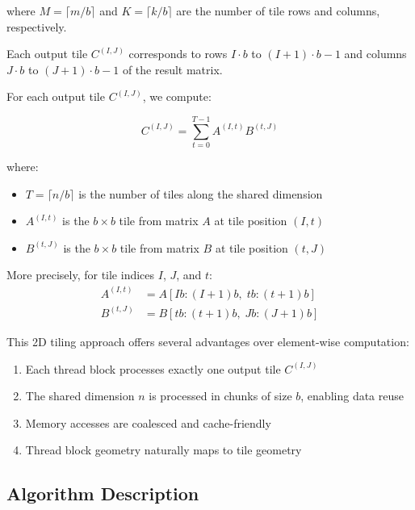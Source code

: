 \documentclass{amsbook}
\theoremstyle{definition}
\begin{document}
where $M = \lceil m/b \rceil$ and $K = \lceil k/b \rceil$ are the number of tile rows and columns, respectively.

Each output tile $C^{(I,J)}$ corresponds to rows $I \cdot b$ to $(I+1) \cdot b - 1$ and columns $J \cdot b$ to $(J+1) \cdot b - 1$ of the result matrix.

For each output tile $C^{(I,J)}$, we compute:

\begin{equation}
C^{(I,J)} = \sum_{t=0}^{T-1} A^{(I,t)} B^{(t,J)}
\end{equation}

where:
\begin{itemize}
\item $T = \lceil n/b \rceil$ is the number of tiles along the shared dimension
\item $A^{(I,t)}$ is the $b \times b$ tile from matrix $A$ at tile position $(I,t)$
\item $B^{(t,J)}$ is the $b \times b$ tile from matrix $B$ at tile position $(t,J)$
\end{itemize}

More precisely, for tile indices $I$, $J$, and $t$:
\begin{align}
A^{(I,t)} &= A[I b : (I+1) b, \; t b : (t+1) b] \\
B^{(t,J)} &= B[t b : (t+1) b, \; J b : (J+1) b]
\end{align}

This 2D tiling approach offers several advantages over element-wise computation:
\begin{enumerate}
\item Each thread block processes exactly one output tile $C^{(I,J)}$
\item The shared dimension $n$ is processed in chunks of size $b$, enabling data reuse
\item Memory accesses are coalesced and cache-friendly
\item Thread block geometry naturally maps to tile geometry
\end{enumerate}

\subsection{Algorithm Description}
\end{document}
